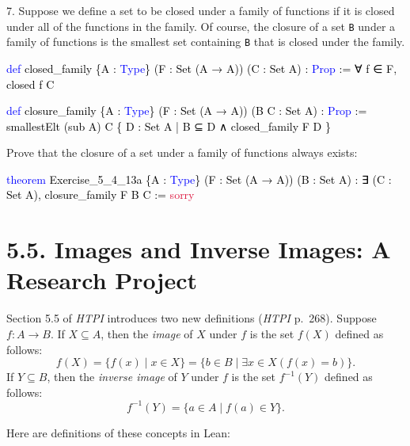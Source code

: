 \documentclass[
  letterpaper,
  DIV=11,
  numbers=noendperiod]{scrreprt}
\newenvironment{Shaded}{\begin{snugshade}}{\end{snugshade}}
\newcommand{\ConstantTok}[1]{\textcolor[rgb]{0.56,0.35,0.01}{#1}}
\newcommand{\KeywordTok}[1]{\textcolor[rgb]{0.00,0.23,0.31}{#1}}
\newcommand{\NormalTok}[1]{\textcolor[rgb]{0.00,0.23,0.31}{#1}}
\renewcommand{\NormalTok}[1]{\textcolor[HTML]{000000}{#1}}
\renewcommand{\KeywordTok}[1]{\textcolor[HTML]{0000FF}{#1}}
\renewcommand{\ConstantTok}[1]{\textcolor[HTML]{DC143C}{#1}}
\theoremstyle{remark}
\begin{document}
7. Suppose we define a set to be closed under a family of functions if
it is closed under all of the functions in the family. Of course, the
closure of a set \texttt{B} under a family of functions is the smallest
set containing \texttt{B} that is closed under the family.

\begin{Shaded}
\begin{Highlighting}[]
\KeywordTok{def}\NormalTok{ closed\_family \{A : }\KeywordTok{Type}\NormalTok{\} (F : Set (A → A)) (C : Set A) : }\KeywordTok{Prop}\NormalTok{ :=}
\NormalTok{  ∀ f ∈ F, closed f C}

\KeywordTok{def}\NormalTok{ closure\_family \{A : }\KeywordTok{Type}\NormalTok{\} (F : Set (A → A)) (B C : Set A) : }\KeywordTok{Prop}\NormalTok{ :=}
\NormalTok{  smallestElt (sub A) C \{ D : Set A | B ⊆ D ∧ closed\_family F D \}}
\end{Highlighting}
\end{Shaded}

Prove that the closure of a set under a family of functions always
exists:

\begin{Shaded}
\begin{Highlighting}[]
\KeywordTok{theorem}\NormalTok{ Exercise\_5\_4\_13a \{A : }\KeywordTok{Type}\NormalTok{\} (F : Set (A → A)) (B : Set A) :}
\NormalTok{    ∃ (C : Set A), closure\_family F B C := }\ConstantTok{sorry}
\end{Highlighting}
\end{Shaded}

\hypertarget{images-and-inverse-images-a-research-project}{%
\section{5.5. Images and Inverse Images: A Research
Project}\label{images-and-inverse-images-a-research-project}}

Section 5.5 of \emph{HTPI} introduces two new definitions (\emph{HTPI}
p.~268). Suppose \(f : A \to B\). If \(X \subseteq A\), then the
\emph{image} of \(X\) under \(f\) is the set \(f(X)\) defined as
follows: \[
f(X) = \{f(x) \mid x \in X\} = \{b \in B \mid \exists x \in X(f(x) = b)\}.
\] If \(Y \subseteq B\), then the \emph{inverse image} of \(Y\) under
\(f\) is the set \(f^{-1}(Y)\) defined as follows: \[
f^{-1}(Y) = \{a \in A \mid f(a) \in Y\}.
\]

Here are definitions of these concepts in Lean:
\end{document}
